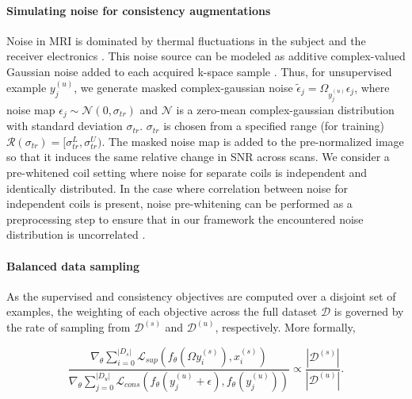 \documentclass[10pt,twocolumn,letterpaper]{article}
\newcommand{\noiserange}{\mathcal{R}(\sigma_{tr})}
\newcommand{\RV}[1]{{#1}}
\begin{document}
\paragraph{Simulating noise for consistency augmentations} Noise in MRI is dominated by thermal fluctuations in the subject and the receiver electronics \cite{redpath1998signal}. This noise source can be modeled as additive complex-valued Gaussian noise added to each acquired k-space sample \cite{macovski1996noise}. Thus, for unsupervised example ${y^{(u)}_j}$, we generate \RV{masked complex-gaussian noise $\tilde{\epsilon}_j = \Omega_{y^{(u)}_j} \epsilon_j$}, where noise map $\epsilon_j \sim \mathcal{N}(0,\sigma_{tr})$ and $\mathcal{N}$ is a zero-mean complex-gaussian distribution with standard deviation $\sigma_{tr}$. $\sigma_{tr}$ is chosen from a specified range (for training) $\noiserange = [\sigma_{tr}^L, \sigma_{tr}^U)$. \RV{The masked noise map is added to the pre-normalized image so that it induces the same relative change in SNR across scans.} We consider a \RV{pre-whitened coil} setting where noise for separate coils is independent and identically distributed. In the case where correlation between noise for independent coils is present, noise pre-whitening can be performed as a preprocessing step to ensure that in our framework the encountered noise distribution is uncorrelated \cite{hansen2015image}.


\paragraph{Balanced data sampling} As the supervised and consistency objectives are computed over a disjoint set of examples, the weighting of each objective \RV{across the full dataset $\mathcal{D}$} is governed by the rate of sampling from $\mathcal{D}^{(s)}$ and $\mathcal{D}^{(u)}$, respectively. More formally, 

\RV{
\begin{equation*}
 \frac{\nabla_\theta \sum_{i=0}^{|D_s|}\mathcal{L}_{sup}(f_{\theta}(\Omega y_i^{(s)}), x_i^{(s)})}{\nabla_\theta\sum_{j=0}^{|D_u|}\mathcal{L}_{cons}(f_{\theta}(y_j^{(u)}+\epsilon),f_{\theta}(y_j^{(u)}))} \propto \frac{|\mathcal{D}^{(s)}|}{|\mathcal{D}^{(u)}|}.
\end{equation*}
}
\end{document}
